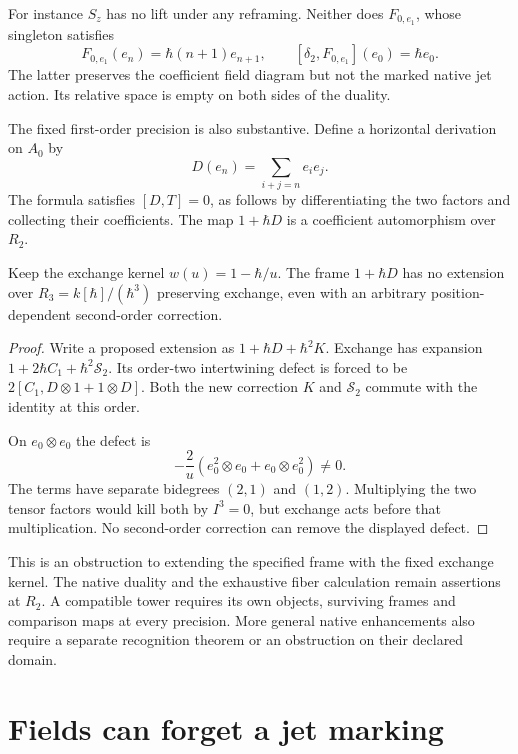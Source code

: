 For instance $S_z$ has no lift under any reframing.
Neither does $F_{0,e_1}$, whose singleton satisfies
\[
 F_{0,e_1}(e_n)=\hbar(n+1)e_{n+1},
 \qquad[\delta_2,F_{0,e_1}](e_0)=\hbar e_0.
\]
The latter preserves the coefficient field diagram
but not the marked native jet action. Its relative
space is empty on both sides of the duality.

The fixed first-order precision is also substantive.
Define a horizontal derivation on $A_0$ by
\[
 D(e_n)=\sum_{i+j=n}e_ie_j.
\]
The formula satisfies $[D,T]=0$, as follows by
differentiating the two factors and collecting
their coefficients. The map $1+\hbar D$ is
a coefficient automorphism over $R_2$.

\begin{proposition}
\label{v4-arith:md:prop:precision}
Keep the exchange kernel $w(u)=1-\hbar/u$.
The frame $1+\hbar D$ has no extension over
$R_3=k[\hbar]/(\hbar^3)$ preserving exchange,
even with an arbitrary position-dependent
second-order correction.
\end{proposition}

\begin{proof}
Write a proposed extension as
$1+\hbar D+\hbar^2K$. Exchange has expansion
$1+2\hbar C_1+\hbar^2\mathcal S_2$.
Its order-two intertwining defect is forced to be
$2[C_1,D\otimes1+1\otimes D]$.
Both the new correction $K$ and $\mathcal S_2$
commute with the identity at this order.

On $e_0\otimes e_0$ the defect is
\begin{equation}\label{v4-arith:md:eq:precision-defect}
 -\frac2u(e_0^2\otimes e_0+e_0\otimes e_0^2)\ne0.
\end{equation}
The terms have separate bidegrees $(2,1)$ and
$(1,2)$. Multiplying the two tensor factors
would kill both by $I^3=0$, but exchange acts
before that multiplication. No second-order
correction can remove the displayed defect.
\end{proof}

This is an obstruction to extending the specified
frame with the fixed exchange kernel. The native
duality and the exhaustive fiber calculation
remain assertions at $R_2$. A compatible tower
requires its own objects, surviving frames and
comparison maps at every precision. More general
native enhancements also require a separate
recognition theorem or an obstruction on their
declared domain.

\section{Fields can forget a jet marking}
\label{v4-arith:md:sec:filtered-moments}

